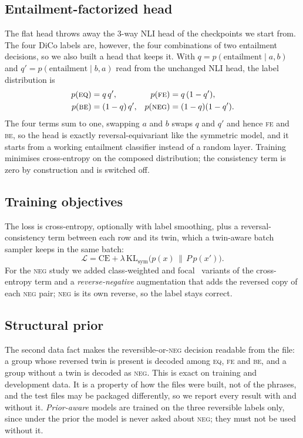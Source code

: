 \documentclass[conference]{IEEEtran}
\newcommand{\EQ}{\textsc{eq}}
\newcommand{\FE}{\textsc{fe}}
\newcommand{\BE}{\textsc{be}}
\newcommand{\NEG}{\textsc{neg}}
\begin{document}
\subsection{Entailment-factorized head}
\label{sec:factorized}
The flat head throws away the 3-way NLI head of the checkpoints we start from.
The four DiCo labels are, however, the four combinations of two entailment
decisions, so we also built a head that keeps it. With
$q=p(\text{entailment}\mid a,b)$ and $q'=p(\text{entailment}\mid b,a)$ read from
the unchanged NLI head, the label distribution is
\begin{align}
  p(\EQ) &= q\,q', & p(\FE) &= q\,(1-q'), \nonumber\\
  p(\BE) &= (1-q)\,q', & p(\NEG) &= (1-q)(1-q').
\end{align}
The four terms sum to one, swapping $a$ and $b$ swaps $q$ and $q'$ and hence
\FE{} and \BE, so the head is exactly reversal-equivariant like the symmetric
model, and it starts from a working entailment classifier instead of a random
layer. Training minimises cross-entropy on the composed distribution; the
consistency term is zero by construction and is switched off.



\subsection{Training objectives}
The loss is cross-entropy, optionally with label smoothing,
plus a reversal-consistency term between each row and its twin, which a
twin-aware batch sampler keeps in the same batch:
\begin{equation}
  \mathcal{L} = \mathrm{CE} + \lambda\,\mathrm{KL}_{\mathrm{sym}}\bigl(p(x)\,\|\,P\,p(x')\bigr).
\end{equation}
For the \NEG{} study we added class-weighted and focal~\cite{lin2017focal}
variants of the cross-entropy term and a \emph{reverse-negative} augmentation
that adds the reversed copy of each \NEG{} pair; \NEG{} is its own reverse, so
the label stays correct.

\subsection{Structural prior}
The second data fact makes the reversible-or-\NEG{} decision readable from the
file: a group whose reversed twin is present is decoded among \EQ, \FE{} and
\BE, and a group without a twin is decoded as \NEG. This is exact on training
and development data. It is a property of how the files were built, not of
the phrases, and the test files may be packaged differently, so we report
every result with and without it. \emph{Prior-aware} models are trained on the
three reversible labels only, since under the prior the model is never asked
about \NEG; they must not be used without it.
\end{document}
